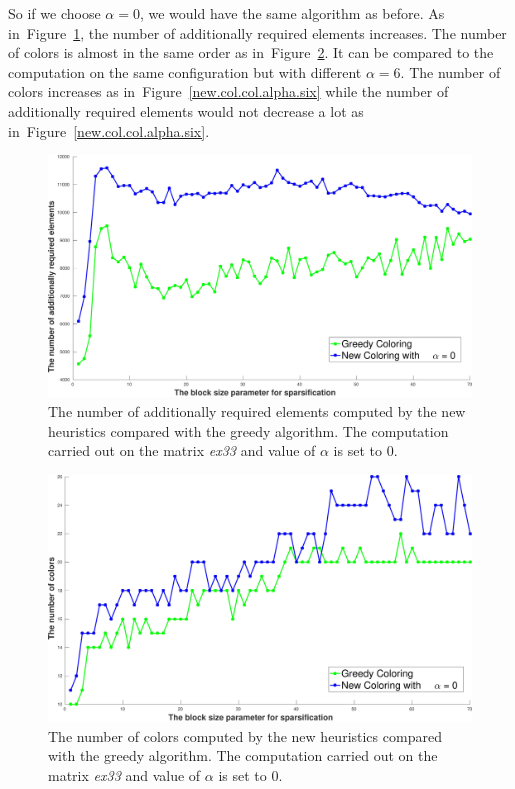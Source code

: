 \documentclass[12pt, twoside,a4paper,toc=bibliography]{scrbook}
\newcommand{\figref}[1]{Figure~\protect\ref{#1}}
\begin{document}
So if we choose $\alpha=0$, we would have the same algorithm as before.
As in~\figref{new.col.add.alpha.zero}, the number of additionally required elements
increases. The number of colors is almost in the same order as in~\figref{new.col.col.alpha.zero}.
It can be compared to the computation on the same configuration but with different $\alpha=6$.
The number of colors increases as in~\figref{new.col.col.alpha.six} while
the number of additionally required elements would not decrease a lot as in~\figref{new.col.col.alpha.six}.
\begin{figure}
\centering
\includegraphics[width=0.9\linewidth]{bls_add_alpha_0}
\caption{The number of additionally required elements computed by the new heuristics compared with the
greedy algorithm. The computation carried out on the matrix \textit{ex33} and value of $\alpha$ is
set to $0$.}
\label{new.col.add.alpha.zero}
\end{figure}
\begin{figure}
\centering
\includegraphics[width=0.9\linewidth]{bls_col_alpha_0}
\caption{The number of colors computed by the new heuristics compared with the
greedy algorithm. The computation carried out on the matrix \textit{ex33} and value of $\alpha$ is
set to $0$.}
\label{new.col.col.alpha.zero}
\end{figure}
\end{document}
